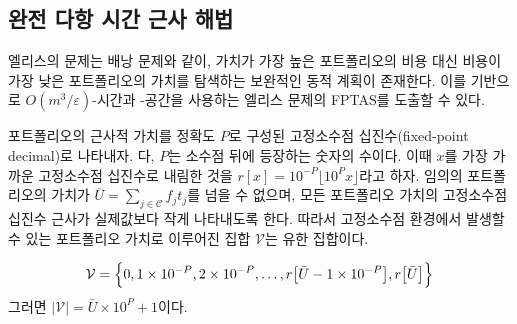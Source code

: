 \documentclass[11pt]{article} %
\newif\ifen
\theoremstyle{definition}
\theoremstyle{definition}
\begin{document}
\ifen \subsection{Fully polynomial-time approximation scheme}\else \subsection{완전 다항 시간 근사 해법}\fi \label{fptashead}
\ifen 
As with the knapsack problem, Ellis's problem admits a complementary dynamic program that iterates on the value of the cheapest portfolio instead of on the cost of the most valuable portfolio. We will use this algorithm as the basis for an FPTAS for Ellis's problem that uses $O(m^3 / \varepsilon)$-time and -space.%
\else
엘리스의 문제는 배낭 문제와 같이, 가치가 가장 높은 포트폴리오의 비용 대신 비용이 가장 낮은 포트폴리오의 가치를 탐색하는 보완적인 동적 계획이 존재한다. 이를 기반으로  $O(m^3 / \varepsilon)$-시간과 -공간을 사용하는 엘리스 문제의 FPTAS를 도출할 수 있다.%
\fi


\ifen 
We will represent approximate portfolio valuations using a fixed-point decimal with a precision of $P$, where $P$ is the number of digits to retain after the decimal point. Let $r[x] =  10^{-P}\lfloor 10^P x \rfloor$ denote the value of $x$ rounded down to its nearest fixed-point representation. Since $\bar U = \sum_{j\in \mathcal{C}} f_j t_j$ is an upper bound on the valuation of any portfolio, and since we will ensure that each fixed-point approximation is an underestimate of the portfolio's true valuation, the set $\mathcal{V}$ of possible valuations possible in the fixed-point framework is finite:
\else
포트폴리오의 근사적 가치를 정확도 $P$로 구성된 고정소수점 십진수(fixed-point decimal)로 나타내자. 다, $P$는 소수점 뒤에 등장하는 숫자의 수이다. 이때 $x$를 가장 가까운 고정소수점 십진수로 내림한 것을 $r[x] =  10^{-P}\lfloor 10^P x \rfloor$라고 하자. 임의의 포트폴리오의 가치가 $\bar U = \sum_{j\in \mathcal{C}} f_j t_j$를 넘을 수 없으며, 모든 포트폴리오 가치의 고정소수점 십진수 근사가 실제값보다 작게 나타내도록 한다. 따라서 고정소수점 환경에서 발생할 수 있는 포트폴리오 가치로 이루어진 집합 $\mathcal{V}$는 유한 집합이다.
\fi
\begin{equation}
\mathcal{V} = \Bigl\{0, 1\times 10^{-P}, 2\times 10^{-P}, \dots, r\bigl[\bar U- 1\times 10^{-P}\bigr], r\bigl[\bar U\bigr]\Bigr\}
\end{equation}
\ifen Then $|\mathcal{V} | = \bar U \times 10^P + 1$.
\else 그러면 $|\mathcal{V} | = \bar U \times 10^P + 1$이다.\fi
\end{document}
